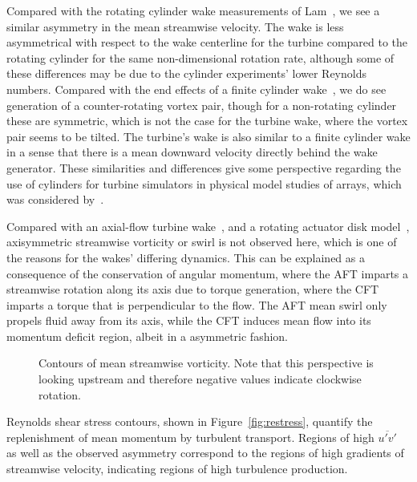 Compared with the rotating cylinder wake measurements of Lam~\cite{Lam2009}, we
see a similar asymmetry in the mean streamwise velocity. The wake is less
asymmetrical with respect to the wake centerline for the turbine compared to the
rotating cylinder for the same non-dimensional rotation rate, although some of
these differences may be due to the cylinder experiments' lower Reynolds
numbers. Compared with the end effects of a finite cylinder
wake~\cite{Sumner2004}, we do see generation of a counter-rotating vortex pair,
though for a non-rotating cylinder these are symmetric, which is not the case
for the turbine wake, where the vortex pair seems to be tilted. The turbine's
wake is also similar to a finite cylinder wake in a sense that there is a mean
downward velocity directly behind the wake generator. These similarities and
differences give some perspective regarding the use of cylinders for turbine
simulators in physical model studies of arrays, which was considered
by~\cite{Pierce2013}.

Compared with an axial-flow turbine wake~\cite{Cal2010}, and a rotating actuator
disk model~\cite{Wu2011}, axisymmetric streamwise vorticity or swirl is not
observed here, which is one of the reasons for the wakes' differing dynamics.
This can be explained as a consequence of the conservation of angular momentum,
where the AFT imparts a streamwise rotation along its axis due to torque
generation, where the CFT imparts a torque that is perpendicular to the flow.
The AFT mean swirl only propels fluid away from its axis, while the CFT induces
mean flow into its momentum deficit region, albeit in a asymmetric fashion.

\begin{figure}
    \centering
    

    \caption{Contours of mean streamwise vorticity. Note that this perspective
        is looking upstream and therefore negative values indicate clockwise
        rotation.}
    
    \label{fig:xvorticity}
\end{figure}

Reynolds shear stress contours, shown in Figure~\ref{fig:restress}, quantify the
replenishment of mean momentum by turbulent transport. Regions of high
$\overline{u'v'}$ as well as the observed asymmetry correspond to the regions of
high gradients of streamwise velocity, indicating regions of high turbulence
production.

